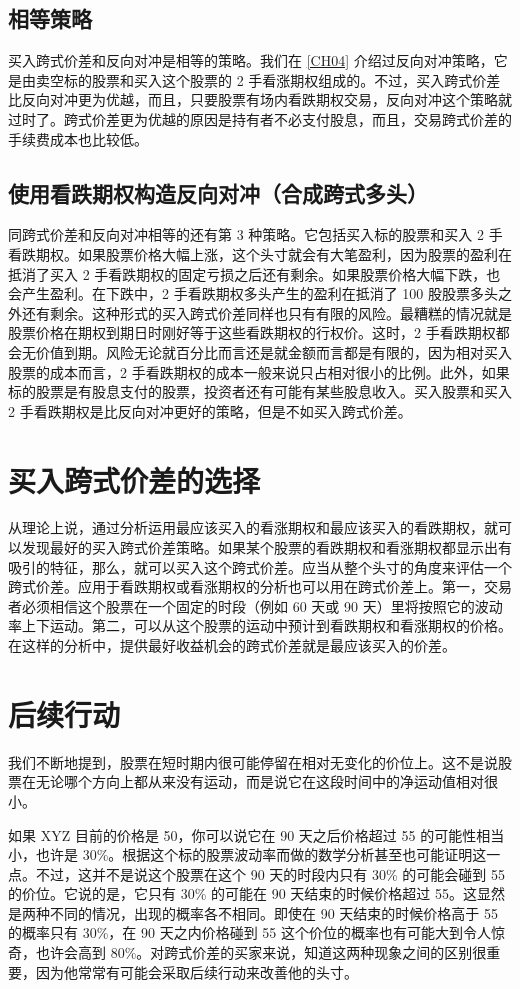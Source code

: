 \subsection{相等策略}
买入跨式价差和反向对冲是相等的策略。我们在 \ref{CH04} 介绍过反向对冲策略，它是由卖空标的股票和买入这个股票的 2 手看涨期权组成的。不过，买入跨式价差比反向对冲更为优越，而且，只要股票有场内看跌期权交易，反向对冲这个策略就过时了。跨式价差更为优越的原因是持有者不必支付股息，而且，交易跨式价差的手续费成本也比较低。
\subsection{使用看跌期权构造反向对冲（合成跨式多头）}
同跨式价差和反向对冲相等的还有第 3 种策略。它包括买入标的股票和买入 2 手看跌期权。如果股票价格大幅上涨，这个头寸就会有大笔盈利，因为股票的盈利在抵消了买入 2 手看跌期权的固定亏损之后还有剩余。如果股票价格大幅下跌，也会产生盈利。在下跌中，2 手看跌期权多头产生的盈利在抵消了 100 股股票多头之外还有剩余。这种形式的买入跨式价差同样也只有有限的风险。最糟糕的情况就是股票价格在期权到期日时刚好等于这些看跌期权的行权价。这时，2 手看跌期权都会无价值到期。风险无论就百分比而言还是就金额而言都是有限的，因为相对买入股票的成本而言，2 手看跌期权的成本一般来说只占相对很小的比例。此外，如果标的股票是有股息支付的股票，投资者还有可能有某些股息收入。买入股票和买入 2 手看跌期权是比反向对冲更好的策略，但是不如买入跨式价差。
\section{买入跨式价差的选择}
从理论上说，通过分析运用最应该买入的看涨期权和最应该买入的看跌期权，就可以发现最好的买入跨式价差策略。如果某个股票的看跌期权和看涨期权都显示出有吸引的特征，那么，就可以买入这个跨式价差。应当从整个头寸的角度来评估一个跨式价差。应用于看跌期权或看涨期权的分析也可以用在跨式价差上。第一，交易者必须相信这个股票在一个固定的时段（例如 60 天或 90 天）里将按照它的波动率上下运动。第二，可以从这个股票的运动中预计到看跌期权和看涨期权的价格。在这样的分析中，提供最好收益机会的跨式价差就是最应该买入的价差。
\section{后续行动}
我们不断地提到，股票在短时期内很可能停留在相对无变化的价位上。这不是说股票在无论哪个方向上都从来没有运动，而是说它在这段时间中的净运动值相对很小。
\begin{tcolorbox}
    如果 XYZ 目前的价格是 50，你可以说它在 90 天之后价格超过 55 的可能性相当小，也许是 30\%。根据这个标的股票波动率而做的数学分析甚至也可能证明这一点。不过，这并不是说这个股票在这个 90 天的时段内只有 30\% 的可能会碰到 55 的价位。它说的是，它只有 30\% 的可能在 90 天结束的时候价格超过 55。这显然是两种不同的情况，出现的概率各不相同。即使在 90 天结束的时候价格高于 55 的概率只有 30\%，在 90 天之内价格碰到 55 这个价位的概率也有可能大到令人惊奇，也许会高到 80\%。对跨式价差的买家来说，知道这两种现象之间的区别很重要，因为他常常有可能会采取后续行动来改善他的头寸。
\end{tcolorbox}
